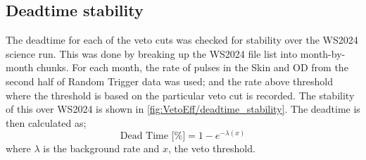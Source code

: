 \subsection{Deadtime stability}\label{sec:VetoEff/DeadtimeStability}
The deadtime for each of the veto cuts was checked for stability over the WS2024 science run.
This was done by breaking up the WS2024 file list into month-by-month chunks.
For each month, the rate of pulses in the Skin and OD from the second half of Random Trigger data was used; and the rate above threshold where the threshold is based on the particular veto cut is recorded. 
The stability of this over WS2024 is shown in \autoref{fig:VetoEff/deadtime_stability}.
The deadtime is then calculated as;
\begin{equation}
	\textrm{Dead Time [\%]} = 1 - e^{-\lambda (x)}
\end{equation}
where $\lambda$ is the background rate and $x$, the veto threshold.

